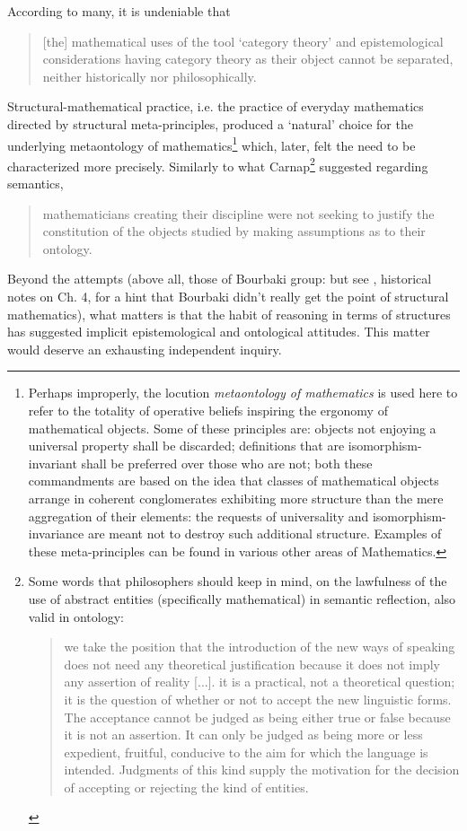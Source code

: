 According to many, it is undeniable that
\begin{quote}
    [the] mathematical uses of the tool `category theory' and epistemological considerations having category theory as their object cannot be separated, neither historically nor philosophically. \cite{kromer2007tool}
\end{quote}
Structural-mathematical practice, i.e. the practice of everyday mathematics directed by structural meta-principles, produced a `natural' choice for the underlying metaontology of mathematics\footnote{Perhaps improperly, the locution \emph{metaontology of mathematics} is used here to refer to the totality of operative beliefs inspiring the ergonomy of mathematical objects. Some of these principles are: objects not enjoying a universal property shall be discarded; definitions that are isomorphism-invariant shall be preferred over those who are not; both these commandments are based on the idea that classes of mathematical objects arrange in coherent conglomerates exhibiting more structure than the mere aggregation of their elements: the requests of universality and isomorphism-invariance are meant not to destroy such additional structure. Examples of these meta-principles can be found in various other areas of Mathematics.} which, later, felt the need to be characterized more precisely. Similarly to what Carnap\footnote{Some words that philosophers should keep in mind, on the lawfulness of the use of abstract entities (specifically mathematical) in semantic reflection, also valid in ontology:
    \begin{quote}
        we take the position that the introduction of the new ways of speaking does not need any theoretical justification because it does not imply any assertion of reality [...].  it is a practical, not a theoretical question; it is the question of whether or not to accept the new linguistic forms. The acceptance cannot be judged as being either true or false because it is not an assertion. It can only be judged as being more or less expedient, fruitful, conducive to the aim for which the language is intended. Judgments of this kind supply the motivation for the decision of accepting or rejecting the kind of entities. \hfill \cite{carnap1956meaning}
    \end{quote}} suggested regarding semantics,
\begin{quote}
    mathematicians creating their discipline were not seeking to justify the constitution of the objects studied by making assumptions as to their ontology.\hfill  \cite{kromer2007tool}
\end{quote}
Beyond the attempts (above all, those of Bourbaki group: but see \cite{McL}, historical notes on Ch. 4, for a hint that Bourbaki didn't really get the point of structural mathematics), what matters is that the habit of reasoning in terms of structures has suggested implicit epistemological and ontological attitudes. This matter would deserve an exhausting independent inquiry.

